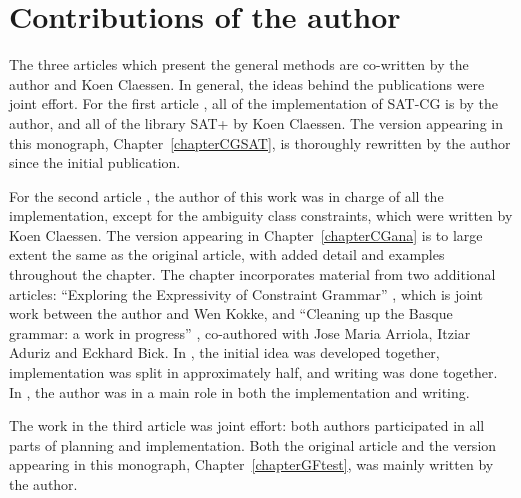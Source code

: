 \section{Contributions of the author}

The three articles which present the general methods \cite{listenmaa_claessen2015,listenmaa_claessen2016,listenmaa_claessen2018} are co-written by the author and Koen Claessen.
In general, the ideas behind the publications were joint effort.
For the first article \cite{listenmaa_claessen2015}, all of the implementation of SAT-CG is by the author,
and all of the library SAT+ by Koen Claessen.
The version appearing in this monograph, Chapter~\ref{chapterCGSAT}, is thoroughly rewritten by the author since the initial publication.

For the second article \cite{listenmaa_claessen2016}, the author of this work was in charge of all the implementation, except for the ambiguity class constraints, which were written by Koen Claessen.
The version appearing in Chapter~\ref{chapterCGana} is to large extent the same as the original article, with added detail and examples throughout the chapter. The chapter incorporates material from two additional articles: ``Exploring the Expressivity of Constraint Grammar'' \cite{kokke2017expressivity}, which is joint work between the author and Wen Kokke, and ``Cleaning up the Basque grammar: a work in progress'' \cite{listenmaa2017basque}, co-authored with Jose Maria Arriola, Itziar Aduriz and Eckhard Bick. In \cite{kokke2017expressivity}, the initial idea was developed together, implementation was split in approximately half, and writing was done together. In \cite{listenmaa2017basque}, the author was in a main role in both the implementation and writing.

The work in the third article \cite{listenmaa_claessen2018} was joint effort: both authors participated in all parts of planning and implementation. Both the original article and the version appearing in this monograph, Chapter~\ref{chapterGFtest}, was mainly written by the author.


